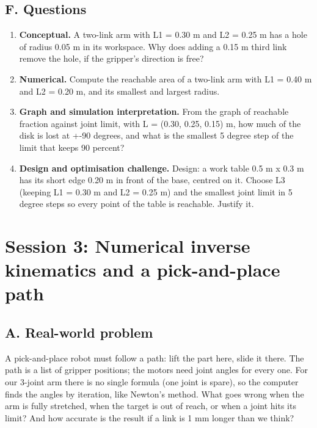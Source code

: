 \documentclass[11pt,a4paper]{article}
\begin{document}
\subsection*{F. Questions}
\begin{enumerate}[nosep]
\item \textbf{Conceptual.} A two-link arm with L1 = 0.30 m and L2 = 0.25 m has a hole of radius 0.05 m in its workspace. Why does adding a 0.15 m third link remove the hole, if the gripper's direction is free?
\item \textbf{Numerical.} Compute the reachable area of a two-link arm with L1 = 0.40 m and L2 = 0.20 m, and its smallest and largest radius.
\item \textbf{Graph and simulation interpretation.} From the graph of reachable fraction against joint limit, with L = (0.30, 0.25, 0.15) m, how much of the disk is lost at +-90 degrees, and what is the smallest 5 degree step of the limit that keeps 90 percent?
\item \textbf{Design and optimisation challenge.} Design: a work table 0.5 m x 0.3 m has its short edge 0.20 m in front of the base, centred on it. Choose L3 (keeping L1 = 0.30 m and L2 = 0.25 m) and the smallest joint limit in 5 degree steps so every point of the table is reachable. Justify it.
\end{enumerate}

\section{Session 3: Numerical inverse kinematics and a pick-and-place path}

\subsection*{A. Real-world problem}
A pick-and-place robot must follow a path: lift the part here, slide it there. The path is a list of gripper positions; the motors need joint angles for every one. For our 3-joint arm there is no single formula (one joint is spare), so the computer finds the angles by iteration, like Newton's method. What goes wrong when the arm is fully stretched, when the target is out of reach, or when a joint hits its limit? And how accurate is the result if a link is 1 mm longer than we think?
\end{document}

